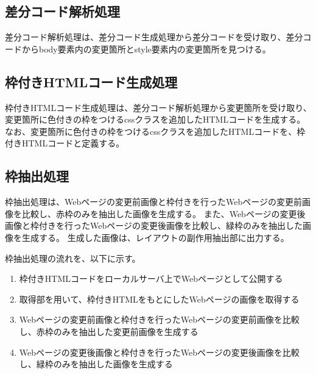 \subsection{差分コード解析処理}\label{subsec:diff_file_analyze}
差分コード解析処理は、差分コード生成処理から差分コードを受け取り、差分コードからbody要素内の変更箇所とstyle要素内の変更箇所を見つける。

\subsection{枠付きHTMLコード生成処理}\label{subsec:modified_html_generate}
枠付きHTMLコード生成処理は、差分コード解析処理から変更箇所を受け取り、変更箇所に色付きの枠をつけるcssクラスを追加したHTMLコードを生成する。
なお、変更箇所に色付きの枠をつけるcssクラスを追加したHTMLコードを、枠付きHTMLコードと定義する。

\subsection{枠抽出処理}\label{subsec:frame_extraction}
枠抽出処理は、Webページの変更前画像と枠付きを行ったWebページの変更前画像を比較し、赤枠のみを抽出した画像を生成する。
また、Webページの変更後画像と枠付きを行ったWebページの変更後画像を比較し、緑枠のみを抽出した画像を生成する。
生成した画像は、レイアウトの副作用抽出部に出力する。
\par
枠抽出処理の流れを、以下に示す。
\begin{enumerate}
    \item 枠付きHTMLコードをローカルサーバ上でWebページとして公開する
    \item 取得部を用いて、枠付きHTMLをもとにしたWebページの画像を取得する
    \item Webページの変更前画像と枠付きを行ったWebページの変更前画像を比較し、赤枠のみを抽出した変更前画像を生成する
    \item Webページの変更後画像と枠付きを行ったWebページの変更後画像を比較し、緑枠のみを抽出した画像を生成する
\end{enumerate}

